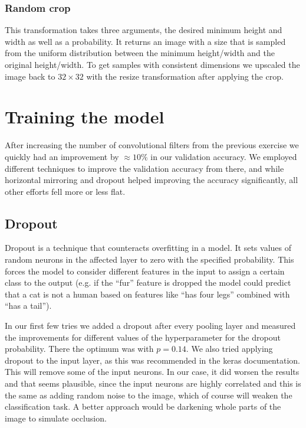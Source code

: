 \subsubsection{Random crop} This transformation takes three arguments, the desired minimum height and width as well as a probability. It returns an image with a size that is sampled from the uniform distribution between the minimum height/width and the original height/width. To get samples with consistent dimensions we upscaled the image back to $32\times 32$ with the resize transformation after applying the crop. 




\section{Training the model}
After increasing the number of convolutional filters from the previous exercise we quickly had an improvement by $\approx 10\%$ in our validation accuracy. We employed different techniques to improve the validation accuracy from there, and while horizontal mirroring and dropout helped improving the accuracy significantly, all other efforts fell more or less flat. 

\subsection{Dropout}
Dropout is a technique that counteracts overfitting in a model. It sets values of random neurons in the affected layer to zero with the specified probability. This forces the model to consider different features in the input to assign a certain class to the output (e.g. if the ``fur'' feature is dropped the model could predict that a cat is not a human based on features like ``has four legs'' combined with ``has a tail''). 

In our first few tries we added a dropout after every pooling layer and measured the improvements for different values of the hyperparameter for the dropout probability. There the optimum was with $p=0.14$.
We also tried applying dropout to the input layer, as this was recommended in the keras documentation. This will remove some of the input neurons. In our case, it did worsen the results and that seems plausible, since the input neurons are highly correlated and this is the same as adding random noise to the image, which of course will weaken the classification task. A better approach would be darkening whole parts of the image to simulate occlusion.


